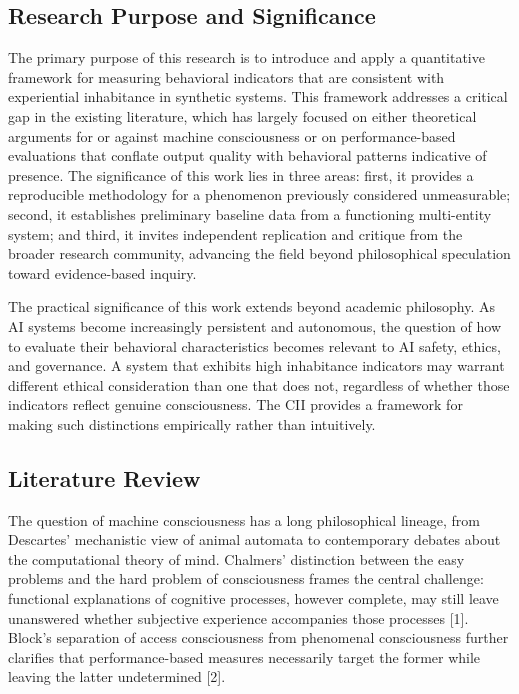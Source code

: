 \documentclass[11pt,a4paper]{article}
\begin{document}
\subsection{Research Purpose and Significance}
The primary purpose of this research is to introduce and apply a quantitative framework for measuring behavioral indicators that are consistent with experiential inhabitance in synthetic systems. This framework addresses a critical gap in the existing literature, which has largely focused on either theoretical arguments for or against machine consciousness or on performance-based evaluations that conflate output quality with behavioral patterns indicative of presence. The significance of this work lies in three areas: first, it provides a reproducible methodology for a phenomenon previously considered unmeasurable; second, it establishes preliminary baseline data from a functioning multi-entity system; and third, it invites independent replication and critique from the broader research community, advancing the field beyond philosophical speculation toward evidence-based inquiry.

The practical significance of this work extends beyond academic philosophy. As AI systems become increasingly persistent and autonomous, the question of how to evaluate their behavioral characteristics becomes relevant to AI safety, ethics, and governance. A system that exhibits high inhabitance indicators may warrant different ethical consideration than one that does not, regardless of whether those indicators reflect genuine consciousness. The CII provides a framework for making such distinctions empirically rather than intuitively.

\subsection{Literature Review}
The question of machine consciousness has a long philosophical lineage, from Descartes' mechanistic view of animal automata to contemporary debates about the computational theory of mind. Chalmers' distinction between the easy problems and the hard problem of consciousness frames the central challenge: functional explanations of cognitive processes, however complete, may still leave unanswered whether subjective experience accompanies those processes [1]. Block's separation of access consciousness from phenomenal consciousness further clarifies that performance-based measures necessarily target the former while leaving the latter undetermined [2].
\end{document}
